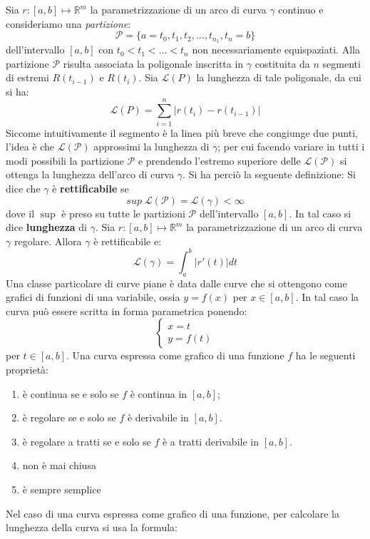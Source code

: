 \documentclass[a4paper]{article}
\numberwithin{equation}{subsection}
\begin{document}
Sia $r: [a,b] \mapsto \mathbb{R}^m$ la parametrizzazione di un arco di curva $\gamma$ continuo e consideriamo una \textit{partizione}:
\[\mathcal{P} = \{a = t_0,t_1,t_2,\dots,t_{n_1},t_n = b\}\]
dell'intervallo $[a,b]$ con $t_0 < t_1 < \dots < t_n$ non necessariamente equispaziati.
Alla partizione $\mathcal{P}$ risulta associata la poligonale inscritta in $\gamma$ costituita da $n$ segmenti di estremi $R(t_{i-1})$ e $R(t_i)$.
Sia $\mathcal{L}(P)$ la lunghezza di tale poligonale, da cui si ha:
\[\mathcal{L}(P) = \sum_{i=1}^n |r(t_i) - r(t_{i-1})|\]
Siccome intuitivamente il segmento è la linea più breve che congiunge due punti, l'idea è che $\mathcal{L}(\mathcal{P})$ approssimi la lunghezza di $\gamma$;
per cui facendo variare in tutti i modi possibili la partizione $\mathcal{P}$ e prendendo l'estremo superiore
delle $\mathcal{L}(\mathcal{P})$ si ottenga la lunghezza dell'arco di curva $\gamma$. Si ha perciò la seguente definizione:
\dfn{}
{
    Si dice che $\gamma$ è \textbf{rettificabile} se
    \[sup \; \mathcal{L}(\mathcal{P}) = \mathcal{L}(\gamma) < \infty\]
    dove il $\sup$ è preso su tutte le partizioni $\mathcal{P}$ dell'intervallo $[a,b]$. In tal caso si dice \textbf{lunghezza} di $\gamma$.
}
\thm{}
{
    Sia $r: [a,b] \mapsto \mathbb{R}^m$ la parametrizzazione di un arco di curva $\gamma$ regolare. Allora $\gamma$ è rettificabile e:
    \[\mathcal{L}(\gamma) = \int_{a}^{b} |r'(t)|dt\]
}
\noindent
Una classe particolare di curve piane è data dalle curve che si ottengono come grafici di funzioni di una variabile, ossia $y = f(x)$ per $x \in [a,b]$. 
In tal caso la curva può essere scritta in forma parametrica ponendo:
\[
\begin{cases}
    x = t\\
    y = f(t)
\end{cases}
\]
per $t \in [a,b]$. Una curva espressa come grafico di una funzione $f$ ha le seguenti proprietà:
\begin{enumerate}
    \item è continua se e solo se $f$ è continua in $[a,b]$;
    \item è regolare se e solo se $f$ è derivabile in $[a,b]$.
    \item è regolare a tratti se e solo se $f$ è a tratti derivabile in $[a,b]$.
    \item non è mai chiusa
    \item è sempre semplice
\end{enumerate}
Nel caso di una curva espressa come grafico di una funzione, per calcolare la lunghezza della curva si usa la formula:
\end{document}
